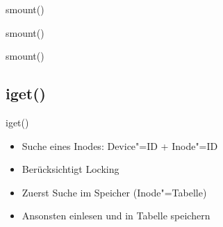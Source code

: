 \documentclass{beamer}
\begin{document}

\begin{frame}{smount()}
\end{frame}

\begin{frame}{smount()}
\end{frame}

\begin{frame}{smount()}
\end{frame}




\subsection{iget()}

\begin{frame}{iget()}
    \begin{itemize}
        \item Suche eines Inodes: Device"=ID + Inode"=ID
        \item Berücksichtigt Locking

        \bigskip

        \item Zuerst Suche im Speicher (Inode"=Tabelle)
        \item Ansonsten einlesen und in Tabelle speichern
    \end{itemize}
\end{frame}
\end{document}
